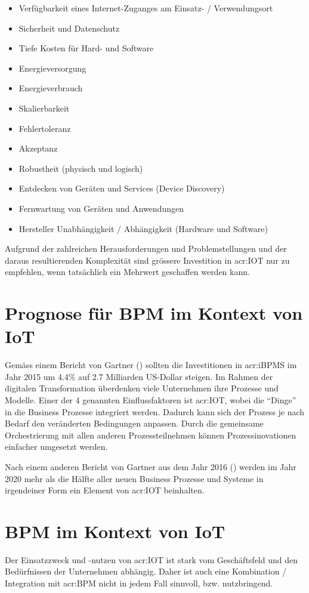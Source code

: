 \begin{itemize}
\item Verfügbarkeit eines Internet-Zuganges am Einsatz- / Verwendungsort
\item Sicherheit und Datenschutz
\item Tiefe Kosten für Hard- und Software
\item Energieversorgung
\item Energieverbrauch
\item Skalierbarkeit
\item Fehlertoleranz
\item Akzeptanz
\item Robustheit (physisch und logisch)
\item Entdecken von Geräten und Services (Device Discovery)
\item Fernwartung von Geräten und Anwendungen
\item Hersteller Unabhängigkeit / Abhängigkeit (Hardware und Software)
\end{itemize}

Aufgrund der zahlreichen Herausforderungen und Problemstellungen und der daraus resultierenden Komplexität sind grössere Investition in \gls{acr:IOT} nur zu empfehlen, wenn tatsächlich ein Mehrwert geschaffen werden kann.
\newpage

\section{Prognose für BPM im Kontext von IoT}
Gemäss einem Bericht von Gartner (\cite{E:Gartner:BPM:2015}) sollten die Investitionen in \gls{acr:iBPMS} im Jahr 2015 um 4.4\% auf 2.7 Milliarden US-Dollar steigen. Im Rahmen der digitalen Transformation überdenken viele Unternehmen ihre Prozesse und Modelle. Einer der 4 genannten Einflussfaktoren ist \gls{acr:IOT}, wobei die "`Dinge"' in die Business Prozesse integriert werden. Dadurch kann sich der Prozess je nach Bedarf den veränderten Bedingungen anpassen. Durch die gemeinsame Orchestrierung mit allen anderen Prozessteilnehmen können Prozessinovationen einfacher umgesetzt werden.

Nach einem anderen Bericht von Gartner aus dem Jahr 2016 (\cite{E:Gartner:BPM:IOT:2020}) werden im Jahr 2020 mehr als die Hälfte aller neuen Business Prozesse und Systeme in irgendeiner Form ein Element von \gls{acr:IOT} beinhalten.


\section{BPM im Kontext von IoT}
Der Einsatzzweck und -nutzen von \gls{acr:IOT} ist stark vom Geschäftsfeld und den Bedürfnissen der Unternehmen abhängig. Daher ist auch eine Kombination / Integration mit \gls{acr:BPM} nicht in jedem Fall sinnvoll, bzw. nutzbringend.

